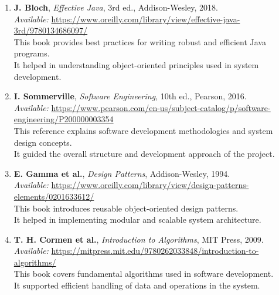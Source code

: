 \documentclass[a4paper,timesnewroman,12pt,twoside]{report}
\numberwithin{equation}{section}
\begin{document}
\begin{enumerate}
\small

\item \textbf{J. Bloch}, \textit{Effective Java}, 3rd ed., Addison-Wesley, 2018.\\
\textit{Available:} \url{https://www.oreilly.com/library/view/effective-java-3rd/9780134686097/}\\
\hspace*{1em}This book provides best practices for writing robust and efficient Java programs.\\
\hspace*{1em}It helped in understanding object-oriented principles used in system development.

\item \textbf{I. Sommerville}, \textit{Software Engineering}, 10th ed., Pearson, 2016.\\
\textit{Available:} \url{https://www.pearson.com/en-us/subject-catalog/p/software-engineering/P200000003354}\\
\hspace*{1em}This reference explains software development methodologies and system design concepts.\\
\hspace*{1em}It guided the overall structure and development approach of the project.

\item \textbf{E. Gamma et al.}, \textit{Design Patterns}, Addison-Wesley, 1994.\\
\textit{Available:} \url{https://www.oreilly.com/library/view/design-patterns-elements/0201633612/}\\
\hspace*{1em}This book introduces reusable object-oriented design patterns.\\
\hspace*{1em}It helped in implementing modular and scalable system architecture.

\item \textbf{T. H. Cormen et al.}, \textit{Introduction to Algorithms}, MIT Press, 2009.\\
\textit{Available:} \url{https://mitpress.mit.edu/9780262033848/introduction-to-algorithms/}\\
\hspace*{1em}This book covers fundamental algorithms used in software development.\\
\hspace*{1em}It supported efficient handling of data and operations in the system.


\end{enumerate}
\end{document}

